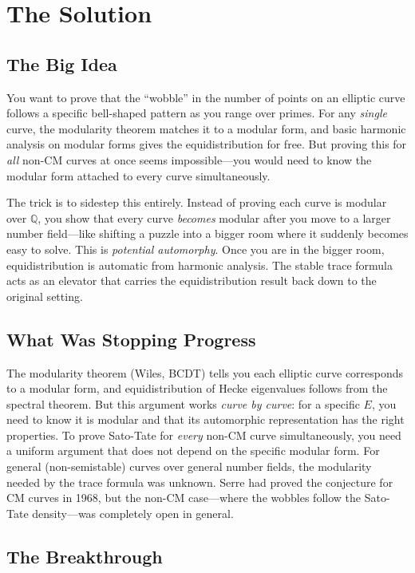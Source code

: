\section{The Solution}

\subsection{The Big Idea}

You want to prove that the ``wobble'' in the number of points on an elliptic curve follows a specific bell-shaped pattern as you range over primes. For any \emph{single} curve, the modularity theorem matches it to a modular form, and basic harmonic analysis on modular forms gives the equidistribution for free. But proving this for \emph{all} non-CM curves at once seems impossible---you would need to know the modular form attached to every curve simultaneously.

The trick is to sidestep this entirely. Instead of proving each curve is modular over $\mathbb{Q}$, you show that every curve \emph{becomes} modular after you move to a larger number field---like shifting a puzzle into a bigger room where it suddenly becomes easy to solve. This is \emph{potential automorphy}. Once you are in the bigger room, equidistribution is automatic from harmonic analysis. The stable trace formula acts as an elevator that carries the equidistribution result back down to the original setting.

\subsection{What Was Stopping Progress}

The modularity theorem (Wiles, BCDT) tells you each elliptic curve corresponds to a modular form, and equidistribution of Hecke eigenvalues follows from the spectral theorem. But this argument works \emph{curve by curve}: for a specific $E$, you need to know it is modular and that its automorphic representation has the right properties. To prove Sato-Tate for \emph{every} non-CM curve simultaneously, you need a uniform argument that does not depend on the specific modular form. For general (non-semistable) curves over general number fields, the modularity needed by the trace formula was unknown. Serre had proved the conjecture for CM curves in 1968, but the non-CM case---where the wobbles follow the Sato-Tate density---was completely open in general.

\subsection{The Breakthrough}

